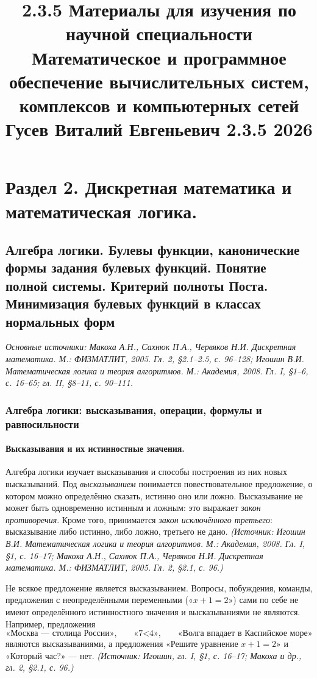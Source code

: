 \documentclass[a4paper,12pt]{article}
\title{2.3.5 Материалы для изучения по научной специальности \\
Математическое и программное обеспечение вычислительных систем, комплексов и компьютерных сетей \\
Гусев Виталий Евгеньевич 2.3.5 2026}
\date{}
\begin{document}
\maketitle

\tableofcontents
\newpage

\section{Раздел 2. Дискретная математика и математическая логика.}

\subsection{Алгебра логики. Булевы функции, канонические формы задания булевых функций. Понятие полной системы. Критерий полноты Поста. Минимизация булевых функций в классах нормальных форм}

\noindent\textit{Основные источники: Макоха А.Н., Сахнюк П.А., Червяков Н.И. Дискретная математика. М.: ФИЗМАТЛИТ, 2005. Гл. 2, §2.1--2.5, с. 96--128; Игошин В.И. Математическая логика и теория алгоритмов. М.: Академия, 2008. Гл. I, §1--6, с. 16--65; гл. II, §8--11, с. 90--111.}

\subsubsection{Алгебра логики: высказывания, операции, формулы и равносильности}

\paragraph{Высказывания и их истинностные значения.}
Алгебра логики изучает высказывания и способы построения из них новых высказываний. Под \emph{высказыванием} понимается повествовательное предложение, о котором можно определённо сказать, истинно оно или ложно. Высказывание не может быть одновременно истинным и ложным: это выражает \emph{закон противоречия}. Кроме того, принимается \emph{закон исключённого третьего}: высказывание либо истинно, либо ложно, третьего не дано.
\textit{(Источник: Игошин В.И. Математическая логика и теория алгоритмов. М.: Академия, 2008. Гл. I, §1, с. 16--17; Макоха А.Н., Сахнюк П.А., Червяков Н.И. Дискретная математика. М.: ФИЗМАТЛИТ, 2005. Гл. 2, §2.1, с. 96.)}

Не всякое предложение является высказыванием. Вопросы, побуждения, команды, предложения с неопределёнными переменными («\(x+1=2\)») сами по себе не имеют определённого истинностного значения и высказываниями не являются. Например, предложения
\[
\text{«Москва — столица России»,}\qquad \text{«7<4»,}\qquad \text{«Волга впадает в Каспийское море»}
\]
являются высказываниями, а предложения «Решите уравнение \(x+1=2\)» и «Который час?» — нет.
\textit{(Источник: Игошин, гл. I, §1, с. 16--17; Макоха и др., гл. 2, §2.1, с. 96.)}
\end{document}
